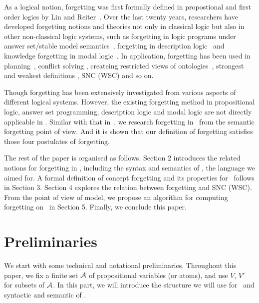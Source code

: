 \documentclass{article}
\begin{document}
As a logical notion, forgetting was first formally defined
in propostional and first order logics by Lin and Reiter~\cite{lin1994forget}.
Over the last twenty years, researchers have developed forgetting notions and theories not only in classical logic but also in other non-classical logic systems, such as forgetting in logic programs under answer set/stable model semantics~\cite{DBLP:Zhang:AIJ2006,Eiter2008Semantic,Wong:PhD:Thesis,Yisong:KR:2012,Yisong:IJCAI:2013}, forgetting in description logic~\cite{Wang:AMAI:2010,Lutz:IJCAI:2011,zhao2017role} and knowledge forgetting in modal logic~\cite{Yan:AIJ:2009,Kaile:JAIR:2009,Yongmei:IJCAI:2011,fang2019forgetting}. In application, forgetting has been used in planning~\cite{lin2003compiling},  conflict solving \cite{Lang2010Reasoning,Zhang2005Solving},
createing restricted views of ontologies~\cite{ZhaoSchmidt18a}, strongest and weakest definitions \cite{Lang2008On}, SNC (WSC) \cite{DBLP:journals/ai/Lin01} and so on.


Though forgetting has been extensively investigated from various aspects of different logical systems.
However, the existing forgetting method in propositional
logic, answer set programming, description logic and modal logic are not directly applicable in \CTL.
Similar with that in~\cite{Yan:AIJ:2009}, we research forgetting in \CTL\ from the semantic forgetting point of view.
And it is shown that our definition of forgetting satisfies those four postulates of forgetting.

The rest of the paper is organised as follows. Section 2 introduces the related notions for forgetting in \CTL, including the syntax and semantics of \CTL, the language we aimed for.
A formal definition of concept forgetting and its properties for \CTL\ follows in Section 3.
Section 4 explores the relation between forgetting and SNC (WSC).
From the point of view of model, we propose an algorithm for computing forgetting on \CTL\ in Section 5.
Finally, we conclude this paper.



 \section{Preliminaries}
 We start with some technical and notational preliminaries. Throughout this paper, we fix a finite set ${\cal A}$ of propositional variables (or atoms), and use $V$, $V'$ for subsets of ${\cal A}$. In this part, we will introduce the structure we will use for \CTL\ and syntactic and semantic of \CTL.
\end{document}
